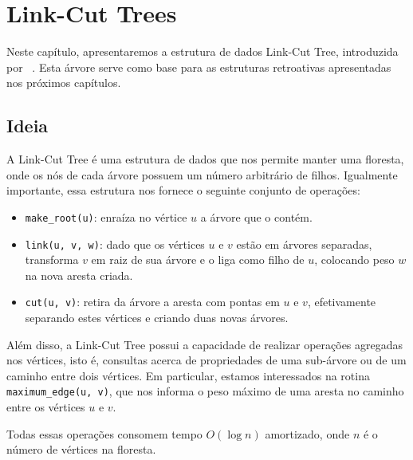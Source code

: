 
\chapter{Link-Cut Trees}
\label{cap:link-cut-trees}

Neste capítulo, apresentaremos a estrutura de dados Link-Cut Tree, introduzida por ~\citet{10.1145/800076.802464}. Esta árvore serve como base para as estruturas retroativas apresentadas nos próximos capítulos.

\section{Ideia}
\label{sec:lct-ideia}

A Link-Cut Tree é uma estrutura de dados que nos permite manter uma floresta, onde os nós de cada árvore possuem um número arbitrário de filhos. Igualmente importante, essa estrutura nos fornece o seguinte conjunto de operações:

\begin{itemize}
    \item \texttt{make\_root(u)}: enraíza no vértice $u$ a árvore que o contém.
    \item \texttt{link(u, v, w)}: dado que os vértices $u$ e $v$ estão em árvores separadas, transforma $v$ em raiz de sua árvore e o liga como filho de $u$, colocando peso $w$ na nova aresta criada.
    \item \texttt{cut(u, v)}: retira da árvore a aresta com pontas em $u$ e $v$, efetivamente separando estes vértices e criando duas novas árvores.
\end{itemize}

Além disso, a Link-Cut Tree possui a capacidade de realizar operações agregadas nos vértices, isto é, consultas acerca de propriedades de uma sub-árvore ou de um caminho entre dois vértices. Em particular, estamos interessados na rotina \texttt{maximum\_edge(u, v)}, que nos informa o peso máximo de uma aresta no caminho entre os vértices $u$ e $v$.

Todas essas operações consomem tempo $O(\log n)$ amortizado, onde $n$ é o número de vértices na floresta.

